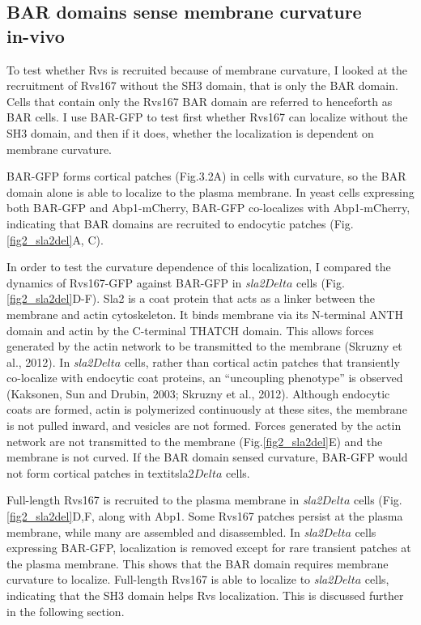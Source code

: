 \newpage

	\subsection{BAR domains sense membrane curvature \\ in-vivo}
\label{sub_curvature}

To test whether Rvs is recruited because of membrane curvature, I looked at the recruitment of Rvs167 without the SH3 domain, that is only the BAR domain. Cells that contain only the Rvs167 BAR domain are referred to henceforth as BAR cells. I use BAR-GFP to test first whether Rvs167 can localize without the SH3 domain, and then if it does, whether the localization is dependent on membrane curvature.

	\vspace{5mm}
BAR-GFP forms cortical patches (Fig.3.2A) in cells with curvature, so the BAR domain alone is able to localize to the plasma membrane. In yeast cells expressing both BAR-GFP and Abp1-mCherry, BAR-GFP co-localizes with Abp1-mCherry, indicating that BAR domains are recruited to endocytic patches  (Fig.\ref{fig2_sla2del}A, C).  



	\vspace{5mm}
In order to test the curvature dependence of this localization, I compared the dynamics of Rvs167-GFP against BAR-GFP in \textit{sla2$Delta$} cells (Fig.\ref{fig2_sla2del}D-F). Sla2 is a coat protein that acts as a linker between the membrane and actin cytoskeleton. It binds membrane via its N-terminal ANTH domain and actin by the C-terminal THATCH domain. This allows forces generated by the actin network to be transmitted to the membrane (Skruzny et al., 2012). In \textit{sla2$Delta$} cells, rather than cortical actin patches that transiently co-localize with endocytic coat proteins, an “uncoupling phenotype” is observed (Kaksonen, Sun and Drubin, 2003; Skruzny et al., 2012). Although endocytic coats are formed, actin is polymerized continuously at these sites, the membrane is not pulled inward, and vesicles are not formed. Forces generated by the actin network are not transmitted to the membrane (Fig.\ref{fig2_sla2del}E) and the membrane is not curved. If the BAR domain sensed curvature, BAR-GFP would not form cortical patches in textit{sla2$Delta$} cells.



Full-length Rvs167 is recruited to the plasma membrane in \textit{sla2$Delta$} cells  (Fig.\ref{fig2_sla2del}D,F, along with Abp1. Some Rvs167 patches persist at the plasma membrane, while many are assembled and disassembled. In \textit{sla2$Delta$} cells expressing BAR-GFP, localization is removed except for rare transient patches at the plasma membrane. This shows that the BAR domain requires membrane curvature to localize. Full-length Rvs167 is able to localize to \textit{sla2$Delta$} cells, indicating that the SH3 domain helps Rvs localization. This is discussed further in the following section. 





